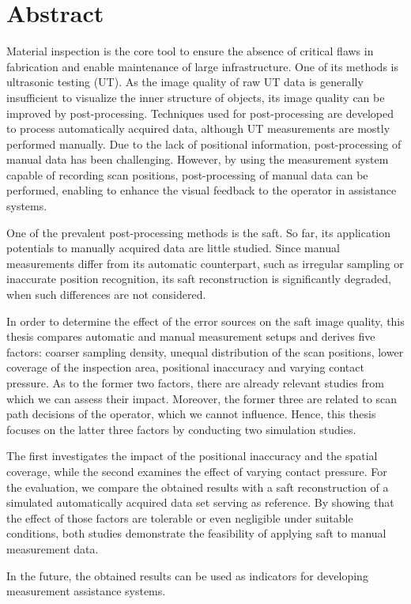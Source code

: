 
\chapter*{\centering Abstract}
Material inspection is the core tool to ensure the absence of critical flaws in fabrication and enable maintenance of large infrastructure. One of its methods is ultrasonic testing (UT). As the image quality of raw UT data is generally insufficient to visualize the inner structure of objects, its image quality can be improved by post-processing. Techniques used for post-processing are developed to process automatically acquired data, although UT measurements are mostly performed manually. Due to the lack of positional information, post-processing of manual data has been challenging. However, by using the measurement system capable of recording scan positions, post-processing of manual data can be performed, enabling to enhance the visual feedback to the operator in assistance systems. \par 
%
One of the prevalent post-processing methods is the \acrfull{saft}. So far, its application potentials to manually acquired data are little studied. Since manual measurements differ from its automatic counterpart, such as irregular sampling or inaccurate position recognition, its \acrshort{saft} reconstruction is significantly degraded, when such differences are not considered. \par
%
In order to determine the effect of the error sources on the \acrshort{saft} image quality, this thesis compares automatic and manual measurement setups and derives five factors: coarser sampling density, unequal distribution of the scan positions, lower coverage of the inspection area, positional inaccuracy and varying contact pressure. As to the former two factors, there are already relevant studies from which we can assess their impact. Moreover, the former three are related to scan path decisions of the operator, which we cannot influence. Hence, this thesis focuses on the latter three factors by conducting two simulation studies.\par
%
The first investigates the impact of the positional inaccuracy and the spatial coverage, while the second examines the effect of varying contact pressure. For the evaluation, we compare the obtained results with a \acrshort{saft} reconstruction of a simulated automatically acquired data set serving as reference. By showing that the effect of those factors are tolerable or even negligible under suitable conditions, both studies demonstrate the feasibility of applying \acrshort{saft} to manual measurement data.\par
%
In the future, the obtained results can be used as indicators for developing measurement assistance systems.\par


